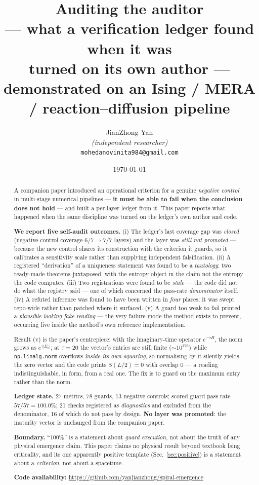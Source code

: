 \documentclass[11pt,a4paper]{article}
\title{\bfseries Auditing the auditor \\[2pt]
\large --- what a verification ledger found when it was \\
\large turned on its own author --- \\[8pt]
\normalsize demonstrated on an Ising / MERA / reaction--diffusion pipeline}
\author{%
   JianZhong Yan\\
  \small \textit{(independent researcher)}\\
  \small \texttt{mohedanovinita984@gmail.com}\\
}
\date{\today}
\newcommand{\code}[1]{\texttt{\small #1}}
\begin{document}
\maketitle

\begin{abstract}
\noindent
A companion paper introduced an operational criterion for a genuine
\emph{negative control} in multi-stage numerical pipelines --- \textbf{it must be
able to fail when the conclusion does not hold} --- and built a per-layer ledger
from it. This paper reports what happened when the same discipline was turned on
the ledger's own author and code.

\textbf{We report five self-audit outcomes.} (i) The ledger's last coverage gap
was \emph{closed} (negative-control coverage $6/7 \to 7/7$ layers) and the layer
was \emph{still not promoted} --- because the new control shares its construction
with the criterion it guards, so it calibrates a sensitivity scale rather than
supplying independent falsification. (ii) A registered ``derivation'' of a
uniqueness statement was found to be a \emph{tautology}: two ready-made theorems
juxtaposed, with the entropy object in the claim not the entropy the code
computes. (iii) Two registrations were found to be \emph{stale} --- the code did
not do what the registry said --- one of which concerned the pass-rate
\emph{denominator} itself. (iv) A refuted inference was found to have been
written in \emph{four} places; it was swept repo-wide rather than patched where
it surfaced. (v) A guard too weak to fail printed a
\emph{plausible-looking fake reading} --- the very failure mode the method
exists to prevent, occurring live inside the method's own reference
implementation.

Result (v) is the paper's centrepiece: with the imaginary-time operator
$e^{-\tau H}$, the norm grows as $e^{\tau|E_0|}$; at $\tau{=}20$ the vector's
entries are still finite ($\sim\!10^{176}$) while \code{np.linalg.norm}
overflows \emph{inside its own squaring}, so normalising by it silently yields
the zero vector and the code prints $S(L/2)=0$ with overlap $0$ --- a reading
indistinguishable, in form, from a real one. The fix is to guard on the maximum
entry rather than the norm.

\textbf{Ledger state.} 27 metrics, 78 guards, 13 negative controls; scored guard
pass rate $57/57=100.0\%$; 21 checks registered as \emph{diagnostics} and
excluded from the denominator, 16 of which do not pass by design.
\textbf{No layer was promoted}: the maturity vector is unchanged from the
companion paper.

\smallskip
\noindent\textbf{Boundary.} ``$100\%$'' is a statement about \emph{guard
execution}, not about the truth of any physical emergence claim. This paper
claims no physical result beyond textbook Ising criticality, and its one
apparently positive template (Sec.~\ref{sec:positive}) is a statement about a
\emph{criterion}, not about a spacetime.

\smallskip
\noindent\textbf{Code availability:}
\url{https://github.com/yanjianzhong/spiral-emergence}
\end{abstract}
\end{document}

